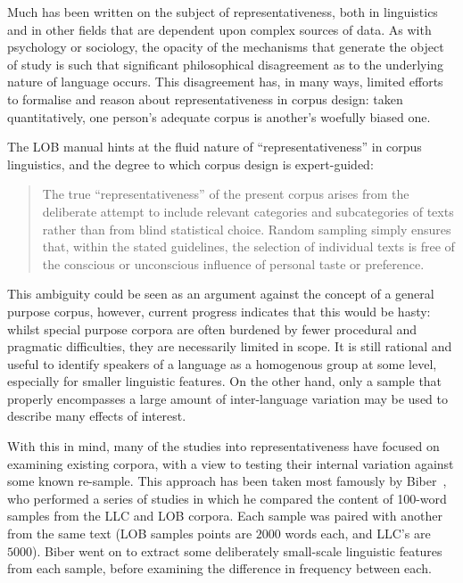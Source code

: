 Much has been written on the subject of representativeness, both in linguistics and in other fields that are dependent upon complex sources of data.  As with psychology or sociology, the opacity of the mechanisms that generate the object of study is such that significant philosophical disagreement as to the underlying nature of language occurs.  This disagreement has, in many ways, limited efforts to formalise and reason about representativeness in corpus design: taken quantitatively, one person's adequate corpus is another's woefully biased one.

The LOB manual hints at the fluid nature of ``representativeness'' in corpus linguistics, and the degree to which corpus design is expert-guided\cite{johansson1986tagged}:
\begin{quote}
The true “representativeness” of the present corpus arises from the deliberate attempt to include relevant categories and subcategories of texts rather than from blind statistical choice. Random sampling simply ensures that, within the stated guidelines, the selection of individual texts is free of the conscious or unconscious influence of personal taste or preference.
\end{quote}


This ambiguity could be seen as an argument against the concept of a general purpose corpus, however, current progress indicates that this would be hasty: whilst special purpose corpora are often burdened by fewer procedural and pragmatic difficulties, they are necessarily limited in scope.  It is still rational and useful to identify speakers of a language as a homogenous group at some level, especially for smaller linguistic features.  On the other hand, only a sample that properly encompasses a large amount of inter-language variation may be used to describe many effects of interest.

With this in mind, many of the studies into representativeness have focused on examining existing corpora, with a view to testing their internal variation against some known re-sample.  This approach has been taken most famously by Biber~\cite{biber1993representativeness}, who performed a series of studies in which he compared the content of 100-word samples from the LLC and LOB corpora.  Each sample was paired with another from the same text (LOB samples points are $2000$ words each, and LLC's are $5000$).  Biber went on to extract some deliberately small-scale linguistic features from each sample, before examining the difference in frequency between each.

